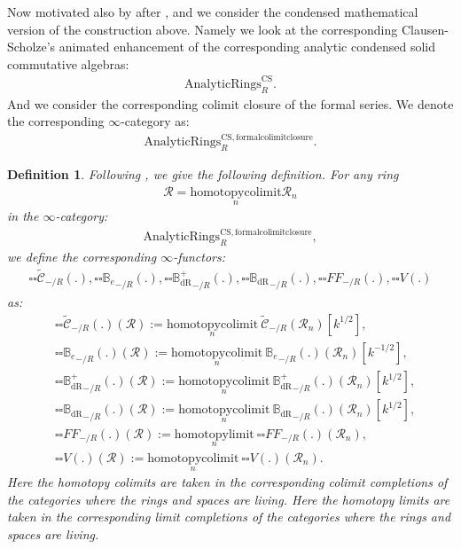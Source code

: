 \documentclass[12pt]{book}
\newtheorem{definition}{Definition}
\begin{document}
\indent Now motivated also by \cite{M} after \cite{CS1}, \cite{CS2} and \cite{CS3} we consider the condensed mathematical version of the construction above. Namely we look at the corresponding Clausen-Scholze's animated enhancement of the corresponding analytic condensed solid commutative algebras:
\begin{align}
\mathrm{AnalyticRings}^\mathrm{CS}_R.	
\end{align}
And we consider the corresponding colimit closure of the formal series. We denote the corresponding $\infty$-category as:
\begin{align}
\mathrm{AnalyticRings}^\mathrm{CS,formalcolimitclosure}_R.	
\end{align}


\begin{definition}
Following \cite[Definition 9.3.3, Definition 9.3.5, Definition 9.3.11, Definition 9.3.9]{KL1}, \cite{KL2} we give the following definition. For any ring
\begin{align}
\mathcal{R}=\underset{n}{\mathrm{homotopycolimit}}\mathcal{R}_n	
\end{align}
in the $\infty$-category:
\begin{align}
\mathrm{AnalyticRings}^\mathrm{CS,formalcolimitclosure}_R,	
\end{align}	
we define the corresponding $\infty$-functors:
\begin{align}
{\square\square}\widetilde{\mathcal{C}}_{-/R}(.),{\square\square}{\mathbb{B}_e}_{-/R}(.),{\square\square}{\mathbb{B}_\mathrm{dR}^+}_{-/R}(.),{\square\square}{\mathbb{B}_\mathrm{dR}}_{-/R}(.),{\square\square}{FF}_{-/R}(.),{\square\square}V(.)	
\end{align}
as:
\begin{align}
&{\square\square}\widetilde{\mathcal{C}}_{-/R}(.)(\mathcal{R}):=\underset{n}{\mathrm{homotopycolimit}}~\widetilde{\mathcal{C}}_{-/R}(\mathcal{R}_n)[k^{1/2}],\\
&{\square\square}{\mathbb{B}_e}_{-/R}(.)(\mathcal{R}):=\underset{n}{\mathrm{homotopycolimit}}~{\mathbb{B}_e}_{-/R}(.)(\mathcal{R}_n)[k^{-1/2}],\\
&{\square\square}{\mathbb{B}_\mathrm{dR}^+}_{-/R}(.)(\mathcal{R}):=\underset{n}{\mathrm{homotopycolimit}}~{\mathbb{B}_\mathrm{dR}^+}_{-/R}(.)(\mathcal{R}_n)[k^{1/2}],\\
&{\square\square}{\mathbb{B}_\mathrm{dR}}_{-/R}(.)(\mathcal{R}):=\underset{n}{\mathrm{homotopycolimit}}~{\mathbb{B}_\mathrm{dR}}_{-/R}(.)(\mathcal{R}_n)[k^{1/2}],\\
&{\square\square}{{FF}}_{-/R}(.)(\mathcal{R}):=\underset{n}{\mathrm{homotopylimit}}~{\square\square}{{FF}}_{-/R}(.)(\mathcal{R}_n),\\	
&{\square\square}V(.)(\mathcal{R}):=\underset{n}{\mathrm{homotopycolimit}}~{\square\square}V(.)(\mathcal{R}_n).
\end{align}
Here the homotopy colimits are taken in the corresponding colimit completions of the categories where the rings and spaces are living. Here the homotopy limits are taken in the corresponding limit completions of the categories where the rings and spaces are living.
\end{definition}
\end{document}
